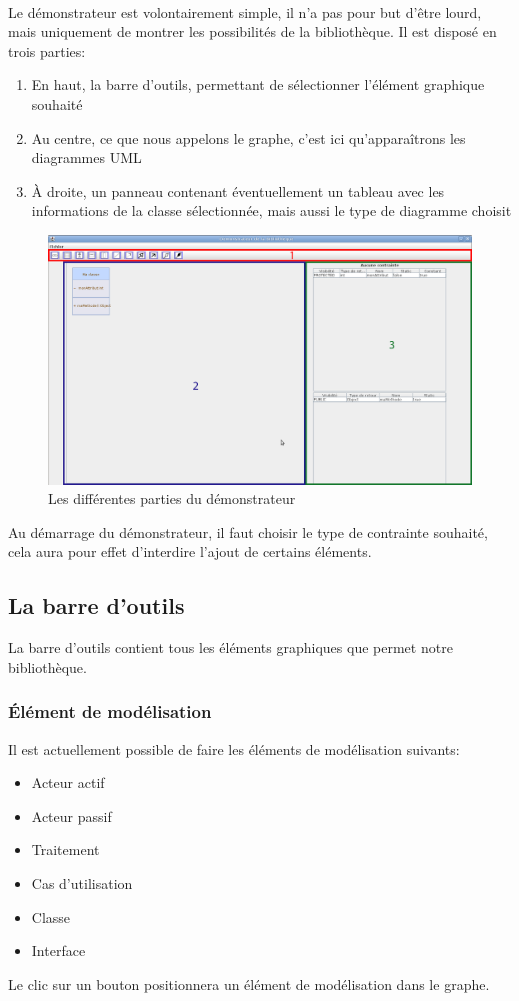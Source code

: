 \documentclass[12pt,a4paper,oneside]{book}
\begin{document}
	\paragraph{}	
	Le démonstrateur est volontairement simple, il n'a pas pour but d'être lourd, mais uniquement de montrer les possibilités de la bibliothèque. 
	Il est disposé en trois parties:
	\begin{enumerate}
		\item En haut, la barre d'outils, permettant de sélectionner l'élément graphique souhaité
		\item Au centre, ce que nous appelons le graphe, c'est ici qu'apparaîtrons les diagrammes UML
		\item À droite, un panneau contenant éventuellement un tableau avec les informations de la classe sélectionnée, mais aussi le type de diagramme choisit
	\end{enumerate}
	\begin{figure}[H]
		\centering
		\includegraphics[width=15cm]{screen1.jpg}
		\caption{Les différentes parties du démonstrateur}
	\end{figure}
	Au démarrage du démonstrateur, il faut choisir le type de contrainte souhaité, cela aura pour effet d'interdire l'ajout de certains éléments.
	\subsection{La barre d'outils}
	La barre d'outils contient tous les éléments graphiques que permet notre bibliothèque.
	\subsubsection{Élément de modélisation}
	Il est actuellement possible de faire les éléments de modélisation suivants:
	\begin{itemize}
		\item Acteur actif
		\item Acteur passif
		\item Traitement
		\item Cas d'utilisation
		\item Classe
		\item Interface
	\end{itemize}
	Le clic sur un bouton positionnera un élément de modélisation dans le graphe.\\
\end{document}
